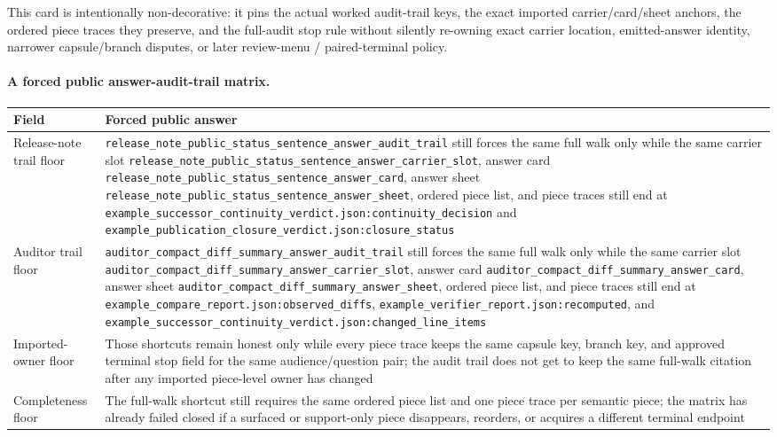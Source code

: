 \documentclass[11pt]{article}
\begin{document}
This card is intentionally non-decorative: it pins the actual worked audit-trail keys, the exact imported carrier/card/sheet anchors, the ordered piece traces they preserve, and the full-audit stop rule without silently re-owning exact carrier location, emitted-answer identity, narrower capsule/branch disputes, or later review-menu / paired-terminal policy.\cite{series:workedexample}

\paragraph{A forced public answer-audit-trail matrix.}
\begin{table}[t]
\centering
\small
\begin{tabularx}{\linewidth}{@{}lX@{}}
\toprule
Field & Forced public answer \\
\midrule
Release-note trail floor & \nolinkurl{release_note_public_status_sentence_answer_audit_trail} still forces the same full walk only while the same carrier slot \nolinkurl{release_note_public_status_sentence_answer_carrier_slot}, answer card \nolinkurl{release_note_public_status_sentence_answer_card}, answer sheet \nolinkurl{release_note_public_status_sentence_answer_sheet}, ordered piece list, and piece traces still end at \nolinkurl{example_successor_continuity_verdict.json:continuity_decision} and \nolinkurl{example_publication_closure_verdict.json:closure_status} \\
Auditor trail floor & \nolinkurl{auditor_compact_diff_summary_answer_audit_trail} still forces the same full walk only while the same carrier slot \nolinkurl{auditor_compact_diff_summary_answer_carrier_slot}, answer card \nolinkurl{auditor_compact_diff_summary_answer_card}, answer sheet \nolinkurl{auditor_compact_diff_summary_answer_sheet}, ordered piece list, and piece traces still end at \nolinkurl{example_compare_report.json:observed_diffs}, \nolinkurl{example_verifier_report.json:recomputed}, and \nolinkurl{example_successor_continuity_verdict.json:changed_line_items} \\
Imported-owner floor & Those shortcuts remain honest only while every piece trace keeps the same capsule key, branch key, and approved terminal stop field for the same audience/question pair; the audit trail does not get to keep the same full-walk citation after any imported piece-level owner has changed \\
Completeness floor & The full-walk shortcut still requires the same ordered piece list and one piece trace per semantic piece; the matrix has already failed closed if a surfaced or support-only piece disappears, reorders, or acquires a different terminal endpoint \\

\end{tabularx}
\end{table}
\end{document}
